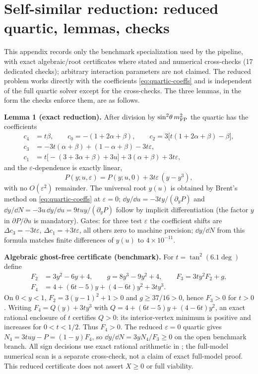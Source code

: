 \section{Self-similar reduction: reduced quartic, lemmas, checks}\label{app:selfsim}
This appendix records only the benchmark specialization used by the pipeline, with exact algebraic/root certificates where stated and numerical cross-checks (17 dedicated checks); arbitrary interaction parameters are not claimed. The reduced problem works directly with the coefficients \eqref{eq:quartic-coeffs} and is independent of the full quartic solver except for the cross-checks. The three lemmas, in the form the checks enforce them, are as follows.

\textbf{Lemma 1 (exact reduction).} After division by $\sin^2\!\theta\,m_{\mathrm{FP}}^2$ the quartic has the coefficients
\begin{equation}
\begin{aligned}
c_4&=t\beta,\qquad c_0=-(1+2\alpha+\beta),\qquad
c_2=3\bigl[t(1+2\alpha+\beta)-\beta\bigr],\\
c_3&=-3t(\alpha+\beta)+(1-\alpha+\beta)-3t\varepsilon,\\
c_1&=t\bigl[-(3+3\alpha+\beta)+3u\bigr]+3(\alpha+\beta)+3t\varepsilon,
\end{aligned}\label{eq:quartic-coeffs}
\end{equation}
and the $\varepsilon$-dependence is exactly linear,
\begin{equation}
P(y;u,\varepsilon)=P(y;u,0)+3t\varepsilon\,(y-y^3),\label{eq:Peps}
\end{equation}
with no $O(\varepsilon^2)$ remainder. The universal root $y(u)$ is obtained by Brent's method on \eqref{eq:quartic-coeffs} at $\varepsilon=0$; $\dd y/\dd u=-3ty/(\partial_yP)$ and $\dd y/\dd N=-3u\,\dd y/\dd u=9tuy/(\partial_yP)$ follow by implicit differentiation (the factor $y$ in $\partial P/\partial u$ is mandatory). Gates: for three test $\varepsilon$ the coefficient shifts are $\Delta c_3=-3t\varepsilon$, $\Delta c_1=+3t\varepsilon$, all others zero to machine precision; $\dd y/\dd N$ from this formula matches finite differences of $y(u)$ to $4\times10^{-11}$.

\textbf{Algebraic ghost-free certificate (benchmark).} For $t=\tan^2(6.1\deg)$ define
\begin{equation*}
\begin{aligned}
F_2&=3y^2-6y+4,\qquad g=8y^3-9y^2+4,\qquad F_3=3ty^2F_2+g,\\
F_4&=4+(6t-5)y+(4-6t)y^2+3ty^3 .
\end{aligned}
\end{equation*}
On $0<y<1$, $F_2=3(y-1)^2+1>0$ and $g\ge37/16>0$, hence $F_3>0$ for $t>0$. Writing $F_4=Q(y)+3ty^3$ with $Q=4+(6t-5)y+(4-6t)y^2$, an exact rational enclosure of $t$ certifies $Q>0$: its interior-vertex minimum is positive and increases for $0<t<1/2$. Thus $F_4>0$. The reduced $\varepsilon=0$ quartic gives $N_4=3tuy-P=(1-y)F_4$, so $\dd y/\dd N=3yN_4/F_3\ge0$ on the open benchmark branch. All sign decisions use exact rational arithmetic in ; the full-model numerical scan is a separate cross-check, not a claim of exact full-model proof. This reduced certificate does not assert $X\ge0$ or full viability.


